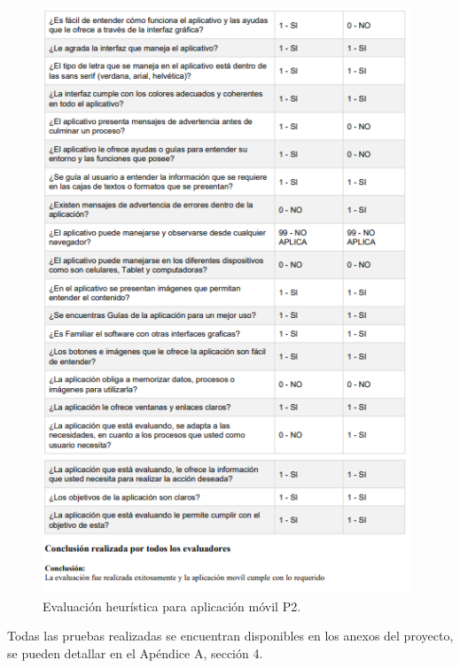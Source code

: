 \documentclass[12pt,letterpaper,openany]{book}
\begin{document}
\begin{figure}[H]
\begin{center}
\includegraphics[width=11cm]{./imagenes/R2}
\caption{Evaluación heurística para aplicación móvil P2.}
\end{center}
\end{figure}

Todas las pruebas realizadas se encuentran disponibles en los anexos del proyecto, se pueden detallar en el Apéndice A, sección 4.

\end{document}
